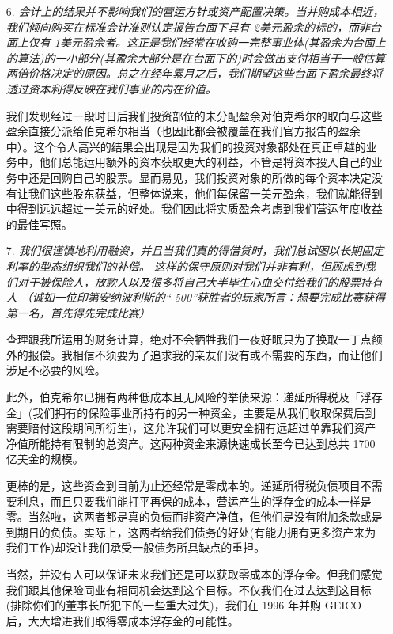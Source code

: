 \documentclass[UTF8,a4paper,zihao=-4,fontset = windows]{ctexart} %
\begin{document}
\begin{itemize}
    \item [6.]
    \textit{会计上的结果并不影响我们的营运方针或资产配置决策。当并购成本相近，我们倾向购买在标准会计准则认定报告台面下具有 2美元盈余的标的，而非台面上仅有 1美元盈余者。这正是我们经常在收购一完整事业体(其盈余为台面上的算法)的一小部分(其盈余大部分是在台面下的)时会做出支付相当于一般估算两倍价格决定的原因。总之在经年累月之后，我们期望这些台面下盈余最终将透过资本利得反映在我们事业的内在价值。 }

    我们发现经过一段时日后我们投资部位的未分配盈余对伯克希尔的取向与这些盈余直接分派给伯克希尔相当（也因此都会被覆盖在我们官方报告的盈余中）。这个令人高兴的结果会出现是因为我们的投资对象都处在真正卓越的业务中，他们总能运用额外的资本获取更大的利益，不管是将资本投入自己的业务中还是回购自己的股票。显而易见，我们投资对象的所做的每个资本决定没有让我们这些股东获益，但整体说来，他们每保留一美元盈余，我们就能得到中得到远远超过一美元的好处。我们因此将实质盈余考虑到我们营运年度收益的最佳写照。

    \item [7.]
    \textit{我们很谨慎地利用融资，并且当我们真的得借贷时，我们总试图以长期固定利率的型态组织我们的补偿。 这样的保守原则对我们并非有利，但顾虑到我们对于被保险人，放款人以及很多将自己大半毕生心血交付给我们的股票持有人 （诚如一位印第安纳波利斯的“ 500”获胜者的玩家所言：想要完成比赛获得第一名，首先得先完成比赛） }

    查理跟我所运用的财务计算，绝对不会牺牲我们一夜好眠只为了换取一丁点额外的报偿。我相信不须要为了追求我的亲友们没有或不需要的东西，而让他们涉足不必要的风险。
    
    此外，伯克希尔已拥有两种低成本且无风险的举债来源：递延所得税及「浮存金」(我们拥有的保险事业所持有的另一种资金，主要是从我们收取保费后到需要赔付这段期间所衍生)，这允许我们可以更安全拥有远超过单靠我们资产净值所能持有限制的总资产。这两种资金来源快速成长至今已达到总共 1700 亿美金的规模。

    更棒的是，这些资金到目前为止还经常是零成本的。递延所得税负债项目不需要利息，而且只要我们能打平再保的成本，营运产生的浮存金的成本一样是零。当然啦，这两者都是真的负债而非资产净值，但他们是没有附加条款或是到期日的负债。实际上，这两者给我们债务的好处(有能力拥有更多资产来为我们工作)却没让我们承受一般债务所具缺点的重担。

    当然，并没有人可以保证未来我们还是可以获取零成本的浮存金。但我们感觉我们跟其他保险同业有相同机会达到这个目标。不仅我们在过去达到这目标(排除你们的董事长所犯下的一些重大过失)，我们在 1996 年并购 GEICO 后，大大增进我们取得零成本浮存金的可能性。


\end{itemize}
\end{document}
